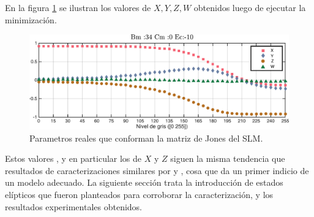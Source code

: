 En la figura \ref{fig:xyzw} se ilustran los valores de $X,Y,Z,W$ obtenidos luego de
ejecutar la minimización. 
\begin{figure}[h!]
\centering
\includegraphics[scale=.55]{xyzw.pdf}
\caption[Parametros reales que conforman la matriz de Jones del SLM]{Parametros reales que conforman la matriz de Jones del SLM.}
\label{fig:xyzw}
\end{figure}
Estos valores , y en particular los de $X$ y
$Z$ siguen la misma tendencia que resultados de caracterizaciones
similares por  y , cosa que
da un primer indicio de un modelo adecuado. 
La siguiente sección trata la introducción de estados elípticos que
fueron planteados para corroborar la caracterización, y los resultados
experimentales obtenidos. 

